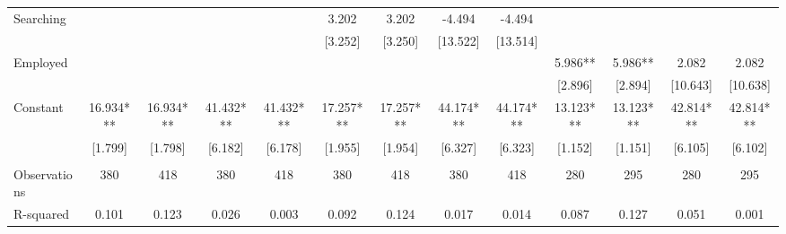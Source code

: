 \begin{tabular}{lcccccccccccc}
Searching &  &  &  &  & 3.202 & 3.202 & -4.494 & -4.494 &  &  &  &  \\
 &  &  &  &  & [3.252] & [3.250] & [13.522] & [13.514] &  &  &  &  \\
Employed &  &  &  &  &  &  &  &  & 5.986** & 5.986** & 2.082 & 2.082 \\
 &  &  &  &  &  &  &  &  & [2.896] & [2.894] & [10.643] & [10.638] \\
Constant & 16.934*** & 16.934*** & 41.432*** & 41.432*** & 17.257*** & 17.257*** & 44.174*** & 44.174*** & 13.123*** & 13.123*** & 42.814*** & 42.814*** \\
 & [1.799] & [1.798] & [6.182] & [6.178] & [1.955] & [1.954] & [6.327] & [6.323] & [1.152] & [1.151] & [6.105] & [6.102] \\
 &  &  &  &  &  &  &  &  &  &  &  &  \\
Observations & 380 & 418 & 380 & 418 & 380 & 418 & 380 & 418 & 280 & 295 & 280 & 295 \\
 R-squared & 0.101 & 0.123 & 0.026 & 0.003 & 0.092 & 0.124 & 0.017 & 0.014 & 0.087 & 0.127 & 0.051 & 0.001 \\ \hline
\end{tabular}
